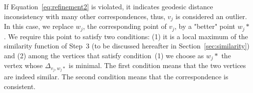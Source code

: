 If Equation~\ref{eq:refinement2} is violated, it indicates geodesic distance inconsistency with many other correspondences, thus, $v_j$ is considered an outlier.
In this case, we replace $w_j$, the corresponding point of $v_j$, by a "better" point $w_j*$.
We require this point to satisfy two conditions:
(1) it is a local maximum of the similarity function of Step~3 (to be discussed hereafter in Section~\ref{sec:similarity}) and (2) among the vertices that satisfy condition~(1) we choose as $w_j*$ the vertex whose $\Delta_{v_j,w_j*}$ is minimal.
The first condition means that the two vertices are indeed similar.
The second condition means that the correspondence is consistent.

